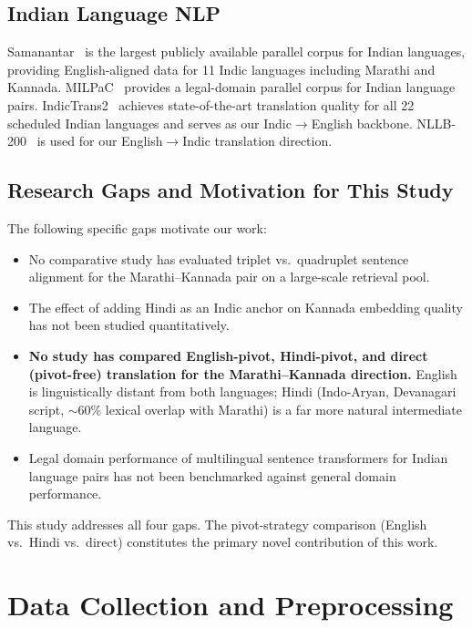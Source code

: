 \documentclass[conference,letterpaper]{IEEEtran}
\begin{document}
\subsection{Indian Language NLP}
Samanantar~\cite{ramesh2021samanantar} is the largest publicly available
parallel corpus for Indian languages, providing English-aligned data for
11 Indic languages including Marathi and Kannada.
MILPaC~\cite{milpac2022} provides a legal-domain parallel corpus for
Indian language pairs. IndicTrans2~\cite{gala2023indictrans2} achieves
state-of-the-art translation quality for all 22 scheduled Indian languages
and serves as our Indic$\rightarrow$English backbone. NLLB-200~\cite{nllb2022}
is used for our English$\rightarrow$Indic translation direction.

\subsection{Research Gaps and Motivation for This Study}
The following specific gaps motivate our work:

\begin{itemize}
    \item No comparative study has evaluated triplet vs.\ quadruplet
    sentence alignment for the Marathi--Kannada pair on a large-scale
    retrieval pool.
    \item The effect of adding Hindi as an Indic anchor on Kannada
    embedding quality has not been studied quantitatively.
    \item \textbf{No study has compared English-pivot, Hindi-pivot, and
    direct (pivot-free) translation for the Marathi--Kannada direction.}
    English is linguistically distant from both languages; Hindi
    (Indo-Aryan, Devanagari script, $\sim$60\% lexical overlap with
    Marathi) is a far more natural intermediate language.
    \item Legal domain performance of multilingual sentence transformers
    for Indian language pairs has not been benchmarked against general
    domain performance.
\end{itemize}

This study addresses all four gaps. The pivot-strategy comparison
(English vs.\ Hindi vs.\ direct) constitutes the primary novel
contribution of this work.

\vspace{0.5cm}

\section{Data Collection and Preprocessing}
\end{document}

